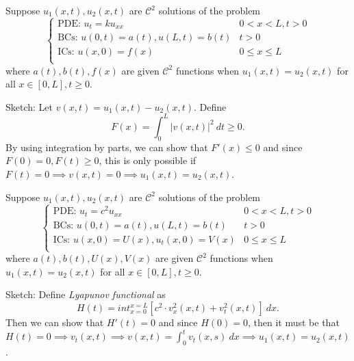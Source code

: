 \documentclass[class=article,crop=false]{standalone}
\begin{document}
\begin{thm}
	Suppose $ u_1(x,t), u_2(x,t)$ are $ \mathcal{ C}^2$ solutions of the problem
	\begin{equation*}
	\begin{cases}
		\text{PDE: }  u_t = k u_{x x} & 0<x<L, t>0 \\
		\text{BCs: } u(0,t) = a(t), u(L,t)=b(t)  & t>0 \\
		\text{ICs: } u(x,0)=f(x) & 0 \leq x \leq L \\
	\end{cases}
	\end{equation*}
	where $ a(t),b(t), f(x)$ are given  $ \mathcal{ C}^2$ functions when $ u_1(x,t)=u_2(x,t)$ for all $ x \in [0,L], t\geq 0$.
\end{thm}
\begin{prf}
	Sketch: Let $ v(x,t)=u_1(x,t)-u_2(x,t)$. Define
	\[
		F(x) = \int_{0}^{L} |v(x,t)|^2 \ dt \geq 0
	.\] 
	By using integration by parts, we can show that $ F'(x)\leq 0$ and since  $ F(0)=0, F(t)\geq 0$, this is only possible if  $ F(t)=0 \implies v(x,t)=0 \implies u_1(x,t)=u_2(x,t)$.
\end{prf}
\begin{thm}
	Suppose $ u_1(x,t), u_2(x,t)$ are $ \mathcal{ C}^2$ solutions of the problem
	\begin{equation*}
	\begin{cases}
		\text{PDE: }  u_t = c^2 u_{x x} & 0<x<L, t>0 \\
		\text{BCs: } u(0,t) = a(t), u(L,t)=b(t)  & t>0 \\
		\text{ICs: } u(x,0)=U(x), u_t(x,0)=V(x) & 0 \leq x \leq L \\
	\end{cases}
	\end{equation*}
	where $ a(t),b(t), U(x), V(x)$ are given  $ \mathcal{ C}^2$ functions when $ u_1(x,t)=u_2(x,t)$ for all $ x \in [0,L], t\geq 0$.
\end{thm}

\newpage
\begin{prf}
Sketch: Define \emph{Lyapunov functional} as 
\[
	H(t) = int_{x=0}^{x=L} [c^2 \cdot  v_{x}^2(x,t) + v_{t}^2(x,t) ] \ dx
.\] 
Then we can show that $ H'(t) = 0 $ and since  $ H(0)=0$, then it must be that  $ H(t)=0 \implies v_{t}(x,t)\implies v(x,t) = \int_0^t v_t (x,s) \ dx \implies u_1(x,t)=u_2(x,t)$.
\end{prf}
\end{document}
